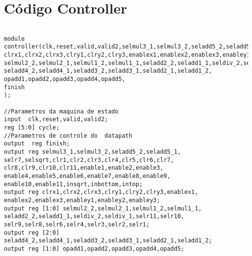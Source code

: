 \section{Código Controller}
\label{codecontroller}
\begin{lstlisting}[style={verilog-style}]

module controller(clk,reset,valid,valid2,selmul3_1,selmul3_2,seladd5_2,seladd5_1,selr7,selsqrt,clr1,clr2,clr3,clr4,clr5,clr6,clr7,clr8,clr9,clr10,clr11,enable1,enable2,enable3,enable4,enable5,enable6,enable7,enable8,enable9,enable10,enable11,insqrt,inbottom,intop,
clrx1,clrx2,clrx3,clry1,clry2,clry3,enablex1,enablex2,enablex3,enabley1,enabley2,enabley3,
selmul2_2,selmul2_1,selmul1_2,selmul1_1,seladd2_2,seladd1_1,seldiv_2,seldiv_1,selr11,selr10,selr9,selr8,selr6,selr4,selr3,selr2,selr1,
seladd4_2,seladd4_1,seladd3_2,seladd3_1,seladd2_1,seladd1_2,
opadd1,opadd2,opadd3,opadd4,opadd5,
finish
);

//Parametros da maquina de estado
input  clk,reset,valid,valid2;
reg [5:0] cycle;
//Parametros de controle do  datapath
output  reg finish;
output reg selmul3_1,selmul3_2,seladd5_2,seladd5_1,
selr7,selsqrt,clr1,clr2,clr3,clr4,clr5,clr6,clr7,
clr8,clr9,clr10,clr11,enable1,enable2,enable3,
enable4,enable5,enable6,enable7,enable8,enable9,
enable10,enable11,insqrt,inbottom,intop;
output reg clrx1,clrx2,clrx3,clry1,clry2,clry3,enablex1,
enablex2,enablex3,enabley1,enabley2,enabley3;
output reg [1:0] selmul2_2,selmul2_1,selmul1_2,selmul1_1,
seladd2_2,seladd1_1,seldiv_2,seldiv_1,selr11,selr10,
selr9,selr8,selr6,selr4,selr3,selr2,selr1;
output reg [2:0] seladd4_2,seladd4_1,seladd3_2,seladd3_1,seladd2_1,seladd1_2;
output reg [1:0] opadd1,opadd2,opadd3,opadd4,opadd5;



\end{lstlisting}
